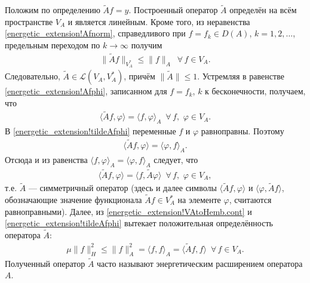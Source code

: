 \documentclass{report}
\begin{document}
Положим по определению $\tilde{A}f=y$. Построенный оператор $\tilde{A}$ определён на всём пространстве $V_A$ и является линейным. Кроме того, из неравенства
\eqref{energetic_extension!Afnorm}, справедливого при $f=f_k\in D(A)$, $k=1,2,\dots$, предельным переходом по $k\to\infty$ получим
\begin{gather*}
\|\tilde{A}f\|_{V^*_A}\leqslant\|f\|_A\,\,\,\forall\,f\in V_A.
\end{gather*}
Следовательно, $\tilde{A}\in\mathcal{L}(V_A,V^*_A)$, причём $\|\tilde{A}\|\leqslant1$. Устремляя в равенстве \eqref{energetic_extension!Afphi}, записанном для $f=f_k$, $k$ к бесконечности,
получаем, что
\begin{gather}\label{energetic_extension!tildeAfphi}
\langle \tilde{A}f,\varphi\rangle=\langle f,\varphi\rangle_A\,\,\,\forall\,f,\,\,\varphi\in V_A.
\end{gather}
В \eqref{energetic_extension!tildeAfphi} переменные $f$ и $\varphi$ равноправны. Поэтому
\begin{gather*}
\langle \tilde{A}f,\varphi\rangle=\langle \varphi,f\rangle_A.
\end{gather*}
Отсюда и из равенства $\langle f,\varphi\rangle_A=\langle \varphi,f\rangle_A$ следует, что
\begin{gather*}
\langle \tilde{A}f,\varphi\rangle=\langle f,\tilde{A}\varphi\rangle\,\,\,\forall\,f,\,\,\varphi\in V_A,
\end{gather*}
т.е. $\tilde{A}$ --- симметричный оператор (здесь и далее символы $\langle \tilde{A}f,\varphi\rangle$ и $\langle \varphi,\tilde{A}f\rangle$, обозначающие значение функционала $\tilde{A}f\in
V^*_A$ на элементе $\varphi$, считаются равноправными). Далее, из \eqref{energetic_extension!VAtoHemb.cont} и \eqref{energetic_extension!tildeAfphi} вытекает положительная определённость
оператора $\tilde{A}$:
\begin{gather*}
\mu\|f\|^2_H\leqslant\|f\|^2_A=\langle f,f\rangle_A=\langle\tilde{A}f,f\rangle\,\,\,\forall\,f\in V_A.
\end{gather*}
Полученный оператор $\tilde{A}$ часто называют энергетическим расширением оператора $A$.
\end{document}
